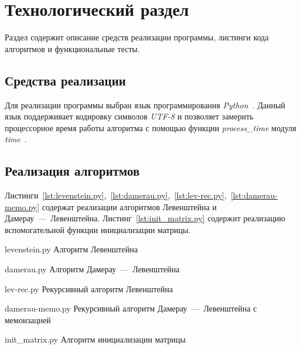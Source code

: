 \chapter{Технологический раздел}

Раздел содержит описание средств реализации программы, листинги кода алгоритмов и функциональные тесты.

\section{Средства реализации}

Для реализации программы выбран язык программирования \textit{Python}~\cite{pydoc}. Данный язык поддерживает кодировку символов \textit{UTF-8} и позволяет замерить процессорное время работы алгоритма с помощью функции \textit{process\_time} модуля \textit{time}~\cite{pytimedoc}.


\section{Реализация алгоритмов}

Листинги~\ref{lst:levenstein.py},~\ref{lst:damerau.py},~\ref{lst:lev-rec.py},~\ref{lst:damerau-memo.py} содержат реализации алгоритмов Левенштейна и Дамерау~---~Левенштейна. Листинг~\ref{lst:init_matrix.py} содержит реализацию вспомогательной функции инициализации матрицы.

{levenstein.py} %
{Алгоритм Левенштейна} %

\clearpage

{damerau.py} %
{Алгоритм Дамерау~---~Левенштейна} %

\clearpage

{lev-rec.py} %
{Рекурсивный алгоритм Левенштейна} %

\clearpage

{damerau-memo.py} %
{Рекурсивный алгоритм Дамерау~---~Левенштейна с мемоизацией} %

\clearpage

{init_matrix.py} %
{Алгоритм инициализации матрицы} %

